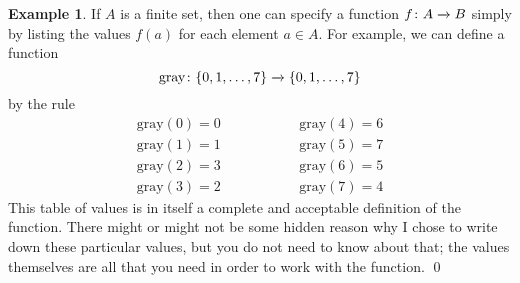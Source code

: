 \documentclass[a4paper]{book}
\theoremstyle{definition}
\newtheorem{example}[theorem]{Example}
\begin{document}
\begin{example}
 If $A$ is a finite set, then one can specify a function $f\colon A\xrightarrow{}B$
 simply by listing the values $f(a)$ for each element $a\in A$.  For
 example, we can define a function
 \[ \text{gray}\colon\{0,1,\ldots,7\}\xrightarrow{}\{0,1,\ldots,7\} \]
 by the rule
 \[ \begin{array}{lll}
     \text{gray}(0) = 0 & \hspace{4em} & \text{gray}(4) = 6 \\
     \text{gray}(1) = 1 &              & \text{gray}(5) = 7 \\
     \text{gray}(2) = 3 &              & \text{gray}(6) = 5 \\
     \text{gray}(3) = 2 &              & \text{gray}(7) = 4
    \end{array}
 \]
 This table of values is in itself a complete and acceptable
 definition of the function.  There might or might not be some hidden
 reason why I chose to write down these particular values, but you do
 not need to know about that; the values themselves are all that you
 need in order to work with the function. \qed
\end{example}
\end{document}
